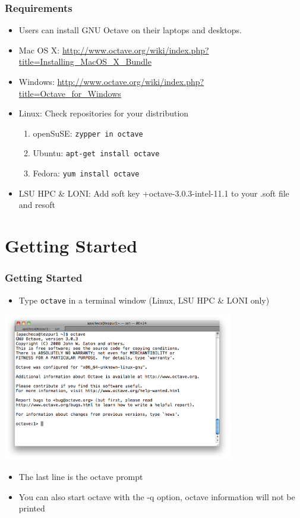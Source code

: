 \documentclass[slidestop,mathserif,compress,xcolor=svgnames]{beamer}
\begin{document}
\begin{frame}
  \frametitle{\small Requirements}
  \begin{itemize}
    \item Users can install GNU Octave on their laptops and desktops.
    \item{Mac OS X:} \url{http://www.octave.org/wiki/index.php?title=Installing_MacOS_X_Bundle}
    \item{Windows:} \url{http://www.octave.org/wiki/index.php?title=Octave_for_Windows} 
    \item{Linux:} Check repositories for your distribution
    \begin{enumerate}
      \item{openSuSE:} \texttt{zypper in octave}
      \item{Ubuntu:} \texttt{apt-get install octave}
      \item{Fedora:} \texttt{yum install octave}
    \end{enumerate}
    \item LSU HPC \& LONI: Add soft key +octave-3.0.3-intel-11.1 to your .soft file and resoft
  \end{itemize}
\end{frame}

\section{Getting Started}
\begin{frame}%
  \frametitle{\small Getting Started}
  \begin{itemize}
    \item Type \texttt{octave} in a terminal window (Linux, LSU HPC \& LONI only)
  \end{itemize}
  \begin{center}
    \includegraphics[width=0.75\textwidth,clip=true]{octave-startup}
  \end{center}
  \begin{itemize}
    \item The last line is the octave prompt
    \item You can also start octave with the -q option, octave information will not be printed
  \end{itemize}
\end{frame}
\end{document}
